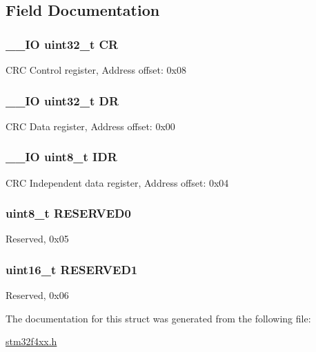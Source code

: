 \subsection{Field Documentation}
\hypertarget{struct_c_r_c___type_def_ab40c89c59391aaa9d9a8ec011dd0907a}{
\subsubsection[{C\-R}]{\setlength{\rightskip}{0pt plus 5cm}\-\_\-\-\_\-\-I\-O uint32\-\_\-t C\-R}}\label{struct_c_r_c___type_def_ab40c89c59391aaa9d9a8ec011dd0907a}
C\-R\-C Control register, Address offset\-: 0x08 \hypertarget{struct_c_r_c___type_def_a3df0d8dfcd1ec958659ffe21eb64fa94}{
\subsubsection[{D\-R}]{\setlength{\rightskip}{0pt plus 5cm}\-\_\-\-\_\-\-I\-O uint32\-\_\-t D\-R}}\label{struct_c_r_c___type_def_a3df0d8dfcd1ec958659ffe21eb64fa94}
C\-R\-C Data register, Address offset\-: 0x00 \hypertarget{struct_c_r_c___type_def_a601d7b0ba761c987db359b2d7173b7e0}{
\subsubsection[{I\-D\-R}]{\setlength{\rightskip}{0pt plus 5cm}\-\_\-\-\_\-\-I\-O uint8\-\_\-t I\-D\-R}}\label{struct_c_r_c___type_def_a601d7b0ba761c987db359b2d7173b7e0}
C\-R\-C Independent data register, Address offset\-: 0x04 \hypertarget{struct_c_r_c___type_def_aa7d2bd5481ee985778c410a7e5826b71}{
\subsubsection[{R\-E\-S\-E\-R\-V\-E\-D0}]{\setlength{\rightskip}{0pt plus 5cm}uint8\-\_\-t R\-E\-S\-E\-R\-V\-E\-D0}}\label{struct_c_r_c___type_def_aa7d2bd5481ee985778c410a7e5826b71}
Reserved, 0x05 \hypertarget{struct_c_r_c___type_def_a8249a3955aace28d92109b391311eb30}{
\subsubsection[{R\-E\-S\-E\-R\-V\-E\-D1}]{\setlength{\rightskip}{0pt plus 5cm}uint16\-\_\-t R\-E\-S\-E\-R\-V\-E\-D1}}\label{struct_c_r_c___type_def_a8249a3955aace28d92109b391311eb30}
Reserved, 0x06 

The documentation for this struct was generated from the following file\-:\begin{DoxyCompactItemize}
\item 
\hyperlink{stm32f4xx_8h}{stm32f4xx.\-h}\end{DoxyCompactItemize}
